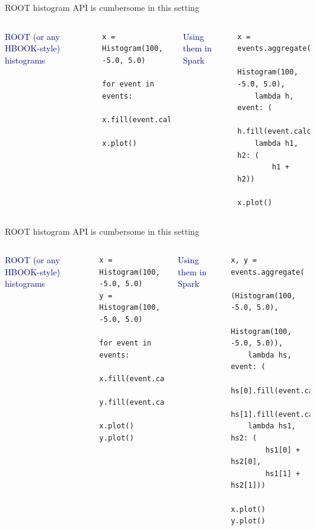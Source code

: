 \documentclass[aspectratio=169]{beamer}
\begin{document}
\begin{frame}[fragile]{ROOT histogram API is cumbersome in this setting}
\vspace{0.5 cm}
\begin{columns}

\textcolor{darkblue}{ROOT (or any HBOOK-style) \mbox{histograms\hspace{-1 cm}}}
\small
\begin{verbatim}
x = Histogram(100, -5.0, 5.0)

for event in events:
    x.fill(event.calcX())

x.plot()
\end{verbatim}

\textcolor{darkblue}{Using them in Spark}
\small
\begin{verbatim}
x = events.aggregate(
    Histogram(100, -5.0, 5.0),
    lambda h, event: (
        h.fill(event.calcX())),
    lambda h1, h2: (
        h1 + h2))

x.plot()
\end{verbatim}
\end{columns}
\end{frame}

\begin{frame}[fragile]{ROOT histogram API is cumbersome in this setting}
\vspace{0.5 cm}
\begin{columns}

\textcolor{darkblue}{ROOT (or any HBOOK-style) \mbox{histograms\hspace{-1 cm}}}
\small
\begin{verbatim}
x = Histogram(100, -5.0, 5.0)
y = Histogram(100, -5.0, 5.0)

for event in events:
    x.fill(event.calcX())
    y.fill(event.calcY())

x.plot()
y.plot()
\end{verbatim}

\textcolor{darkblue}{Using them in Spark}
\small
\begin{verbatim}
x, y = events.aggregate(
    (Histogram(100, -5.0, 5.0),
     Histogram(100, -5.0, 5.0)),
    lambda hs, event: (
        hs[0].fill(event.calcX()),
        hs[1].fill(event.calcY())),
    lambda hs1, hs2: (
        hs1[0] + hs2[0],
        hs1[1] + hs2[1]))

x.plot()
y.plot()
\end{verbatim}
\end{columns}
\end{frame}
\end{document}
